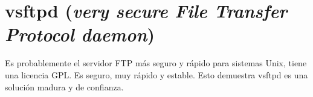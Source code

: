 \section*{vsftpd ({\em very secure File Transfer Protocol daemon})}

Es probablemente el servidor FTP m\'as seguro y r\'apido para sistemas Unix, tiene una licencia GPL. Es seguro, muy rápido y estable. Esto demuestra vsftpd es una solución madura y de confianza.


  
  
  
  
  
  
  
 
  
  
  
  
  
  
